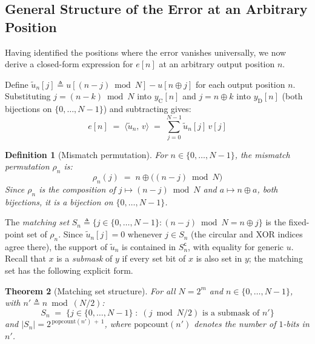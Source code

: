 \documentclass[11pt]{article}
\newtheorem{theorem}{Theorem}
\newtheorem{definition}[theorem]{Definition}
\begin{document}
\subsection{General Structure of the Error at an Arbitrary Position}
\label{sec:general-structure}

Having identified the positions where the error vanishes universally, we now derive a closed-form expression for $e[n]$ at an arbitrary output position $n$.

\noindent Define $\tilde{u}_n[j] \triangleq u[(n-j)\bmod N] - u[n \oplus j]$ for each output position $n$. Substituting $j=(n-k)\bmod N$ into $y_{\mathrm{C}}[n]$ and $j=n\oplus k$ into $y_{\mathrm{D}}[n]$ (both bijections on $\{0,\ldots,N-1\}$) and subtracting gives:
\begin{equation}
    \label{eq:general-closed-form}
    e[n] \;=\; \langle \tilde{u}_n,\, v \rangle \;=\; \sum_{j=0}^{N-1} \tilde{u}_n[j]\, v[j]
\end{equation}

\medskip
\begin{definition}[Mismatch permutation]\label{def:rho}
For $n \in \{0,\ldots,N-1\}$, the \emph{mismatch permutation} $\rho_n$ is:
\begin{equation}
    \label{eq:rho-def}
    \rho_n(j) \;=\; n \oplus \bigl((n-j)\bmod N\bigr)
\end{equation}
Since $\rho_n$ is the composition of $j\mapsto(n-j)\bmod N$ and $a\mapsto n\oplus a$, both bijections, it is a bijection on $\{0,\ldots,N-1\}$.
\end{definition}

\noindent The \emph{matching set} $S_n \triangleq \{j \in \{0,\ldots,N-1\} : (n-j)\bmod N = n \oplus j\}$ is the fixed-point set of $\rho_n$. Since $\tilde{u}_n[j] = 0$ whenever $j \in S_n$ (the circular and XOR indices agree there), the support of $\tilde{u}_n$ is contained in $S_n^{\mathsf{c}}$, with equality for generic $u$. Recall that $x$ is a \emph{submask} of $y$ if every set bit of $x$ is also set in $y$; the matching set has the following explicit form.

\medskip
\begin{theorem}[Matching set structure]\label{thm:matching-set}
For all $N = 2^m$ and $n \in \{0,\ldots,N-1\}$, with $n' \triangleq n \bmod (N/2)$:
\begin{equation}
    S_n \;=\; \bigl\{j \in \{0,\ldots,N-1\} \;:\; (j \bmod N/2) \text{ is a submask of } n'\bigr\}
\end{equation}
and $|S_n| = 2^{\,\mathrm{popcount}(n')\,+\,1}$, where $\mathrm{popcount}(n')$ denotes the number of $1$-bits in $n'$.
\end{theorem}
\end{document}
